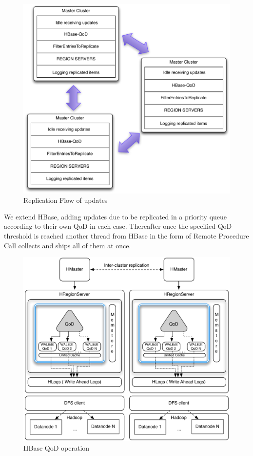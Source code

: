 \begin{figure}[t]
\centering
\includegraphics[width=0.8\linewidth]{figs/ReplicationFlow.pdf}
\caption{Replication Flow of updates}
\label{fig-replication-level}
\end{figure}

We extend HBase, adding updates due to be replicated in a priority queue according to their own QoD in each case. Thereafter once the specified QoD threshold is reached another thread from HBase in the form of Remote Procedure Call collects and ships all of them at once.

\begin{figure}[t]
\centering
\includegraphics[width=0.8\linewidth]{figs/multi-site.pdf}
\caption{HBase QoD operation}
\label{fig-qod-module}
\end{figure}

